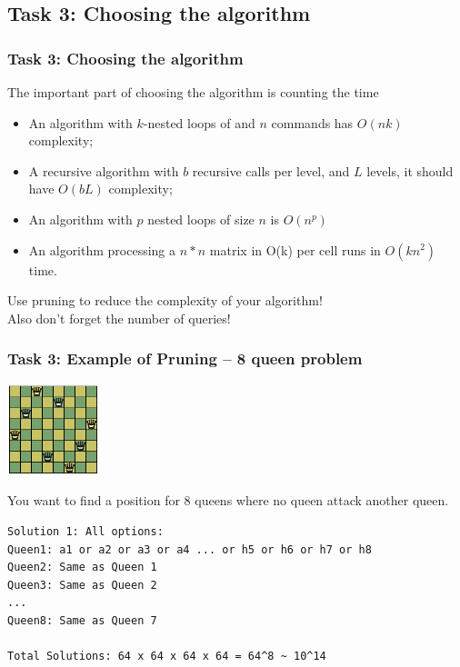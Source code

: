 \subsection{Task 3: Choosing the algorithm}


\begin{frame}
  \frametitle{Task 3: Choosing the algorithm}
  The important part of choosing the algorithm is \alert{counting the time}
  \bigskip

  \begin{itemize}
    \item An algorithm with $k$-nested loops of and $n$ commands
      has $O(nk)$ complexity;
    \item A recursive algorithm with $b$ recursive calls per level, and $L$
      levels, it should have $O(bL)$ complexity;
    \item An algorithm with $p$ nested loops of size $n$ is $O(n^p)$
    \item An algorithm processing a $n*n$ matrix in O(k) per cell runs
      in $O(kn^2)$ time.
  \end{itemize}

  \bigskip

  Use \alert{pruning} to reduce the complexity of your algorithm!\\
  Also don't forget the number of queries!
\end{frame}

\begin{frame}[fragile]
  \frametitle{Task 3: Example of Pruning -- 8 queen problem}

  \hfill \includegraphics[width=0.2\textwidth]{../img/8queen}

  You want to find a position for 8 queens where no queen attack another queen.

  \bigskip

\begin{verbatim}
Solution 1: All options:
Queen1: a1 or a2 or a3 or a4 ... or h5 or h6 or h7 or h8
Queen2: Same as Queen 1
Queen3: Same as Queen 2
...
Queen8: Same as Queen 7

Total Solutions: 64 x 64 x 64 x 64 = 64^8 ~ 10^14
\end{verbatim}
\end{frame}

